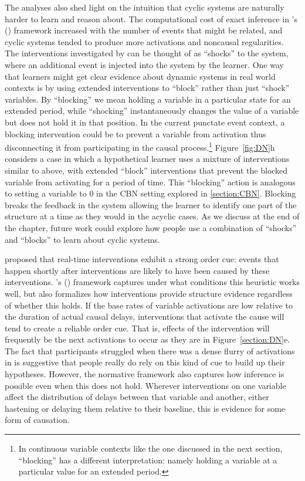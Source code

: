 \documentclass{cambridge7A}%
\def\citeapos#1{\citeauthor{#1}'s (\citeyear{#1})}
\begin{document}
The analyses also shed light on the intuition that cyclic systems are naturally harder to learn and reason about. The computational cost of exact inference in \citeapos{bramley2018time} framework increased with the number of events that might be related, and cyclic systems tended to produce more activations and noncausal regularities.  The interventions investigated by \cite{bramley2017dynamic} can be thought of as ``shocks'' to the system, where an additional event is injected into the system by the learner.  One way that learners might get clear evidence about dynamic systems in real world contexts is by using extended interventions to ``block'' rather than just ``shock'' variables. By ``blocking'' we mean holding a variable in a particular state for an extended period, while ``shocking'' instantaneously changes the value of a variable but does not hold it in that position.  In the current punctate event context, a blocking intervention could be to prevent a variable from activation thus disconnecting it from participating in the causal process.\footnote{In continuous variable contexts like the one discussed in the next section, ``blocking'' has a different interpretation: namely holding a variable at a particular value for an extended period.}  Figure~\ref{fig:DN}h considers a case in which a hypothetical learner uses a mixture of interventions similar to above, with extended ``block'' interventions that prevent the blocked variable from activating for a period of time.  This ``blocking'' action is analogous to setting a variable to 0 in the CBN setting explored in \ref{section:CBN}. Blocking breaks the feedback in the system allowing the learner to identify one part of the structure at a time as they would in the acyclic cases.  As we discuss at the end of the chapter, future work could explore how people use a combination of ``shocks'' and ``blocks'' to learn about cyclic systems.

\cite{lagnado2004advantage} proposed that real-time interventions exhibit a strong order cue: events that happen shortly after interventions are likely to have been caused by these interventions.  \citeapos{bramley2018time} framework captures under what conditions this heuristic works well, but also formalizes how interventions provide structure evidence regardless of whether this holds.  If the base rates of variable activations are low relative to the duration of actual causal delays, interventions that activate the cause will tend to create a reliable order cue.  That is, effects of the intervention will frequently be the next activations to occur as they are in Figure~\ref{section:DN}e.  The fact that participants struggled when there was a dense flurry of activations in \cite{bramley2017dynamic} is suggestive that people really do rely on this kind of cue to build up their hypotheses.  
However, the normative framework also captures how inference is possible even when this does not hold.  Wherever interventions on one variable affect the distribution of delays between that variable and another, either hastening or delaying them relative to their baseline, this is evidence for some form of causation.
\end{document}
